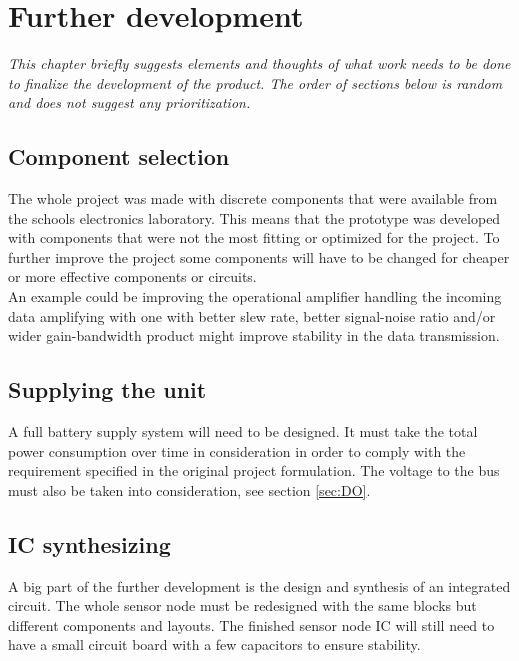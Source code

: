 \chapter{Further development}
\textit{This chapter briefly suggests elements and thoughts of what work needs to be done to finalize the development of the product. The order of sections below is random and does not suggest any prioritization.}

\section{Component selection}
The whole project was made with discrete components that were available from the schools electronics laboratory. This means that the prototype was developed with components that were not the most fitting or optimized for the project. To further improve the project some components will have to be changed for cheaper or more effective components or circuits. \\
An example could be improving the operational amplifier handling the incoming data amplifying with one with better slew rate, better signal-noise ratio and/or wider gain-bandwidth product might improve stability in the data transmission.

\section{Supplying the unit}
A full battery supply system will need to be designed. It must take the total power consumption over time in consideration in order to comply with the requirement specified in the original project formulation. The voltage to the bus must also be taken into consideration, see section \ref{sec:DO}.

\section{IC synthesizing}
A big part of the further development is the design and synthesis of an integrated circuit. The whole sensor node must be redesigned with the same blocks but different components and layouts. The finished sensor node IC will still need to have a small circuit board with a few capacitors to ensure stability.

